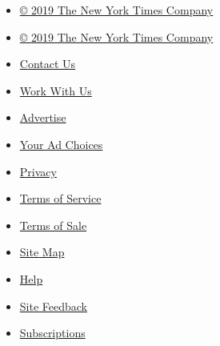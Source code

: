 \begin{itemize}
\tightlist
\item
  \href{http://www.nytco.com}{© 2019 The New York Times Company}
\end{itemize}

\begin{itemize}
\tightlist
\item
  \href{http://www.nytco.com}{© 2019 The New York Times Company}
\item
  \href{http://www.nytimes.com/ref/membercenter/help/infoservdirectory.html}{Contact
  Us}
\item
  \href{http://www.nytco.com/careers}{Work With Us}
\item
  \href{http://www.nytimes.whsites.net/mediakit}{Advertise}
\item
  \href{http://www.nytimes.com/content/help/rights/privacy/policy/privacy-policy.html\#pp}{Your
  Ad Choices}
\item
  \href{http://www.nytimes.com/privacy}{Privacy}
\item
  \href{http://www.nytimes.com/ref/membercenter/help/agree.html}{Terms
  of Service}
\item
  \href{http://www.nytimes.com/content/help/rights/sale/terms-of-sale.html}{Terms
  of Sale}
\end{itemize}

\begin{itemize}
\tightlist
\item
  \href{http://spiderbites.nytimes.com}{Site Map}
\item
  \href{http://www.nytimes.com/membercenter/sitehelp.html}{Help}
\item
  \href{https://myaccount.nytimes.com/membercenter/feedback.html}{Site
  Feedback}
\item
  \href{http://www.nytimes.com/subscriptions/Multiproduct/lp5558.html?campaignId=37WXW}{Subscriptions}
\end{itemize}
